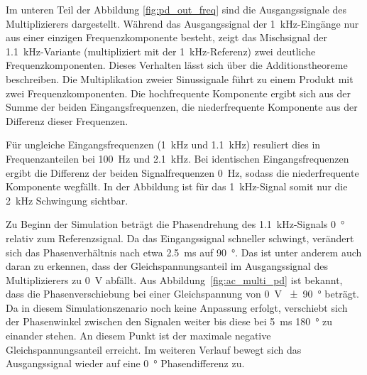 \documentclass[../main.tex]{subfiles}
\begin{document}

Im unteren Teil der Abbildung \ref{fig:pd_out_freq} sind die Ausgangssignale des Multiplizierers dargestellt. Während das Ausgangssignal der \SI{1}{\kilo\hertz}-Eingänge nur aus einer einzigen Frequenzkomponente besteht, zeigt das Mischsignal der \SI{1.1}{\kilo\hertz}-Variante (multipliziert mit der \SI{1}{\kilo\hertz}-Referenz) zwei deutliche Frequenzkomponenten. Dieses Verhalten lässt sich über die Additionstheoreme beschreiben. Die Multiplikation zweier Sinussignale führt zu einem Produkt mit zwei Frequenzkomponenten. Die hochfrequente Komponente ergibt sich aus der Summe der beiden Eingangsfrequenzen, die niederfrequente Komponente aus der Differenz dieser Frequenzen.\par
\medskip

Für ungleiche Eingangsfrequenzen (\SI{1}{\kilo\hertz} und \SI{1.1}{\kilo\hertz}) resuliert dies in Frequenzanteilen bei \SI{100}{\hertz} und \SI{2.1}{\kilo\hertz}. Bei identischen Eingangsfrequenzen ergibt die Differenz der beiden Signalfrequenzen \SI{0}{\hertz}, sodass die niederfrequente Komponente wegfällt. In der Abbildung ist für das \SI{1}{\kilo\hertz}-Signal somit nur die \SI{2}{\kilo\hertz} Schwingung sichtbar. \par
\medskip

Zu Beginn der Simulation beträgt die Phasendrehung des \SI{1.1}{\kilo\hertz}-Signals \SI{0}{\degree} relativ zum Referenzsignal. Da das Eingangssignal schneller schwingt, verändert sich das Phasenverhältnis nach etwa \SI{2.5}{\milli\second} auf \SI{+90}{\degree}. Das ist unter anderem auch daran zu erkennen, dass der Gleichspannungsanteil im Ausgangssignal des Multiplizierers zu \SI{0}{\volt} abfällt. Aus Abbildung~\ref{fig:ac_multi_pd} ist bekannt, dass die Phasenverschiebung bei einer Gleichspannung von \SI{0}{\volt} \SI{\pm 90}{\degree} beträgt. Da in diesem Simulationszenario noch keine Anpassung erfolgt, verschiebt sich der Phasenwinkel zwischen den Signalen weiter bis diese bei \SI{5}{\milli\second} \SI{180}{\degree} zu einander stehen. An diesem Punkt ist der maximale negative Gleichspannungsanteil erreicht. Im weiteren Verlauf bewegt sich das Ausgangssignal wieder auf eine \SI{0}{\degree} Phasendifferenz zu. \par
\medskip
\end{document}
